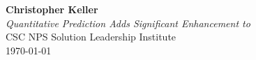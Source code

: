 \begin{titlepage}
	\vspace*{\fill}
	\begin{center}
		\textbf{\huge Christopher Keller}\\[1cm]
        \textit{Quantitative Prediction Adds Significant Enhancement to \climatedge}\\ [.5cm]
		\normalsize CSC NPS Solution Leadership Institute\\ [.5cm]
        \normalsize \today
	\end{center}
	\vspace*{\fill}
\end{titlepage}
